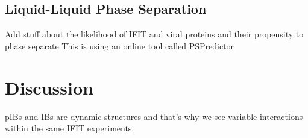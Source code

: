 \subsection{Liquid-Liquid Phase Separation} \label{Liquid-Liquid Phase Separation-Chapter3}
Add stuff about the likelihood of IFIT and viral proteins and their propensity to phase separate \newline
This is using an online tool called PSPredictor


\section{Discussion} \label{Discussion-Chapter3}
pIBs and IBs are dynamic structures and that’s why we see variable interactions within the same IFIT experiments.